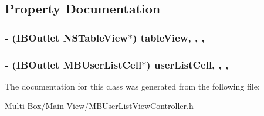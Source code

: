 \subsection{Property Documentation}
\hypertarget{interface_m_b_user_list_view_controller_af20acd3235289aa79700f2872caa1d36}{
\subsubsection[{table\-View}]{\setlength{\rightskip}{0pt plus 5cm}-\/ (I\-B\-Outlet N\-S\-Table\-View$\ast$) table\-View\hspace{0.3cm}{\ttfamily [read]}, {\ttfamily [write]}, {\ttfamily [nonatomic]}, {\ttfamily [strong]}}}\label{interface_m_b_user_list_view_controller_af20acd3235289aa79700f2872caa1d36}
\hypertarget{interface_m_b_user_list_view_controller_ad1ca66d8a912734d65f3a50a8c7d867c}{
\subsubsection[{user\-List\-Cell}]{\setlength{\rightskip}{0pt plus 5cm}-\/ (I\-B\-Outlet {\bf M\-B\-User\-List\-Cell}$\ast$) user\-List\-Cell\hspace{0.3cm}{\ttfamily [read]}, {\ttfamily [write]}, {\ttfamily [nonatomic]}, {\ttfamily [strong]}}}\label{interface_m_b_user_list_view_controller_ad1ca66d8a912734d65f3a50a8c7d867c}


The documentation for this class was generated from the following file\-:\begin{DoxyCompactItemize}
\item 
Multi Box/\-Main View/\hyperlink{_m_b_user_list_view_controller_8h}{M\-B\-User\-List\-View\-Controller.\-h}\end{DoxyCompactItemize}
